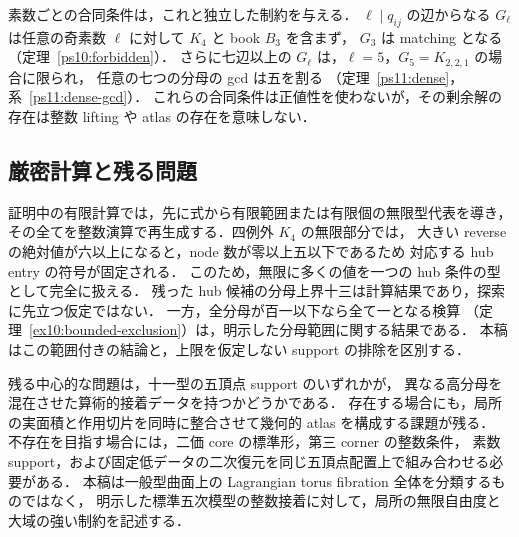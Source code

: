 素数ごとの合同条件は，これと独立した制約を与える．
$\ell\mid q_{ij}$ の辺からなる $G_\ell$ は任意の奇素数 $\ell$ に対して $K_4$ と book $B_3$ を含まず，
$G_3$ は matching となる（定理~\ref{ps10:forbidden}）．
さらに七辺以上の $G_\ell$ は，$\ell=5$，$G_5=K_{2,2,1}$ の場合に限られ，
任意の七つの分母の gcd は五を割る
（定理~\ref{ps11:dense}，系~\ref{ps11:dense-gcd}）．
これらの合同条件は正値性を使わないが，その剰余解の存在は整数 lifting や atlas の存在を意味しない．

\subsection{厳密計算と残る問題}

証明中の有限計算では，先に式から有限範囲または有限個の無限型代表を導き，
その全てを整数演算で再生成する．四例外 $K_4$ の無限部分では，
大きい reverse の絶対値が六以上になると，node 数が零以上五以下であるため
対応する hub entry の符号が固定される．
このため，無限に多くの値を一つの hub 条件の型として完全に扱える．
残った hub 候補の分母上界十三は計算結果であり，探索に先立つ仮定ではない．
一方，全分母が百一以下なら全て一となる検算
（定理~\ref{ex10:bounded-exclusion}）は，明示した分母範囲に関する結果である．
本稿はこの範囲付きの結論と，上限を仮定しない support の排除を区別する．

残る中心的な問題は，十一型の五頂点 support のいずれかが，
異なる高分母を混在させた算術的接着データを持つかどうかである．
存在する場合にも，局所の実面積と作用切片を同時に整合させて幾何的 atlas を構成する課題が残る．
不存在を目指す場合には，二価 core の標準形，第三 corner の整数条件，
素数 support，および固定低データの二次復元を同じ五頂点配置上で組み合わせる必要がある．
本稿は一般型曲面上の Lagrangian torus fibration 全体を分類するものではなく，
明示した標準五次模型の整数接着に対して，局所の無限自由度と大域の強い制約を記述する．
